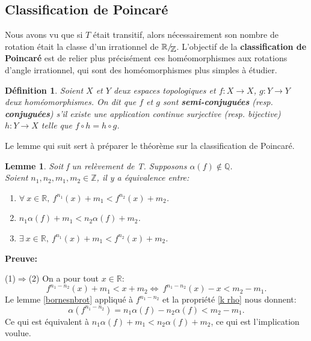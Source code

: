 \documentclass[11pt,a4 paper]{article}
\newtheorem{definition}[theoreme]{Définition}
\newtheorem{lemme}[theoreme]{Lemme}
\newcommand{\Rbb}{\mathbb{R}}
\newcommand*{\EnsembleQuotient}[2]%
{\ensuremath{%
		#1/\!\raisebox{-.65ex}{\ensuremath{\mathcal{#2}}}}}
\newenvironment{defi}{\begin{box_defi}\begin{definition}}{\end{definition}\end{box_defi}}
\newenvironment{lm}{\begin{box_lm}\begin{lemme}}{\end{lemme}\end{box_lm}}
\begin{document}
	
	
\subsection{Classification de Poincaré}	
Nous avons vu que si $T$ était transitif, alors nécessairement son nombre de rotation était la classe d'un irrationnel de $\EnsembleQuotient{\mathbb{R}}{\mathbb{Z}}$. L'objectif de la \textbf{classification de Poincaré} est de relier plus précisément ces homéomorphismes aux rotations d'angle irrationnel, qui sont des homéomorphismes plus simples à étudier.\\


\begin{defi}
	Soient $X$ et $Y$ deux espaces topologiques et $f:X\to X$, $g:Y \to Y$ deux homéomorphismes. On dit que $f$ et $g$ sont \textbf{semi-conjuguées} (resp. \textbf{conjuguées}) s'il existe une application continue surjective (resp. bijective) $h : Y \to X$ telle que $f\circ h = h \circ g$.
\end{defi}


Le lemme qui suit sert à préparer le théorème sur la classification de Poincaré.

	


	
	
\begin{lm}
	Soit f un relèvement de T. Supposons $\alpha(f) \notin \mathbb{Q}$.\\ Soient $n_1,n_2, m_1, m_2 \in \mathbb{Z}$, il y a équivalence entre:
	\begin{enumerate}
	\item $\forall \ x \in \mathbb{R}, \ f^{n_1}(x)+m_1 < f^{n_2}(x)+m_2$.
	\item $n_1 \alpha(f) + m_1 < n_2 \alpha(f) + m_2$.
	\item $\exists \ x \in \mathbb{R}, \ f^{n_1}(x)+m_1 < f^{n_2}(x)+m_2$.
	\end{enumerate}
\end{lm}


	\textbf{Preuve:}\label{lemme poincaré}
	\par(1)$\Rightarrow$(2) On a pour tout $x \in \Rbb$:
	$$ f^{n_1- n_2}(x) + m_1 < x +m_2 \Longleftrightarrow \ f^{n_1- n_2}(x) - x < m_2 -m_1.$$
		Le lemme \ref{bornesnbrot} appliqué à $f^{n_1 - n_2}$ et la propriété \ref{k rho} nous donnent:
		$$\alpha(f^{n_1 - n_2})=n_1 \alpha(f) - n_2 \alpha(f) < m_2 -m_1 .$$
	Ce qui est équivalent à $n_1 \alpha(f) + m_1 < n_2 \alpha(f) +m_2$, ce qui est l'implication voulue.\\
		
\end{document}
